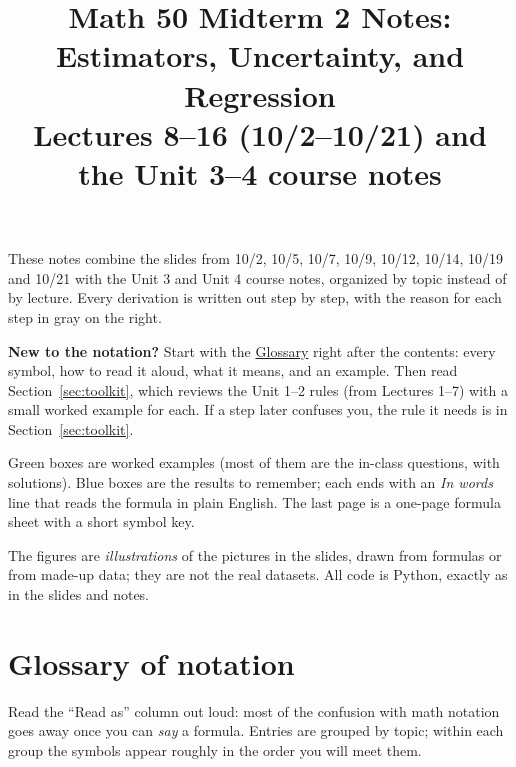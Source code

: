 \documentclass[11pt]{article}
\title{\textbf{Math 50 Midterm 2 Notes: Estimators, Uncertainty, and Regression}\\[2pt]
\large Lectures 8--16 (10/2--10/21) and the Unit 3--4 course notes}
\author{}
\date{}
\begin{document}
\maketitle
\thispagestyle{fancy}

\begin{tipbox}[title={How to use these notes}]
These notes combine the slides from 10/2, 10/5, 10/7, 10/9, 10/12, 10/14, 10/19 and 10/21 with the Unit 3 and Unit 4 course notes,
organized by topic instead of by lecture. Every derivation is written out step by step, with the reason for each step in gray on the right.

\textbf{New to the notation?} Start with the \hyperref[sec:glossary]{Glossary} right after the contents: every symbol, how to read it
aloud, what it means, and an example. Then read Section~\ref{sec:toolkit}, which reviews the Unit 1--2 rules (from Lectures 1--7) with a
small worked example for each. If a step later confuses you, the rule it needs is in Section~\ref{sec:toolkit}.

Green boxes are worked examples (most of them are the in-class questions, with solutions). Blue boxes are the results to remember; each
ends with an \emph{In words} line that reads the formula in plain English. The last page is a one-page formula sheet with a short symbol key.

The figures are \emph{illustrations} of the pictures in the slides, drawn from formulas or from made-up data; they are not the
real datasets. All code is Python, exactly as in the slides and notes.
\end{tipbox}

\tableofcontents

\clearpage
\section*{Glossary of notation}\label{sec:glossary}
Read the ``Read as'' column out loud: most of the confusion with math notation goes away once you can \emph{say} a formula.
Entries are grouped by topic; within each group the symbols appear roughly in the order you will meet them.
\end{document}

